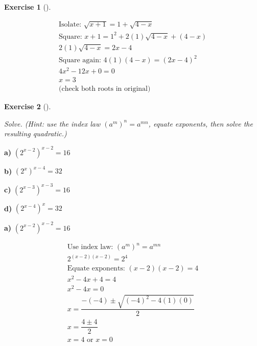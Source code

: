 \documentclass[
  letterpaper,
  DIV=11,
  numbers=noendperiod]{scrreprt}
\theoremstyle{definition}
\newtheorem{exercise}{Exercise}[chapter]
\theoremstyle{remark}
\begin{document}
\begin{exercise}[]
\begin{tcolorbox}
\begin{align*}
\text{Isolate: } \sqrt{x + 1} = 1 + \sqrt{4-x} \\ \text{Square: } x + 1 = 1^2 + 2(1)\sqrt{4-x} + (4-x) \\ 2(1)\sqrt{4-x} = 2x - 4 \\ \text{Square again: } 4(1)(4-x) = (2x -4)^2 \\ 4x^2 -12x +0 = 0 \\ x = 3 \\ \text{(check both roots in original)}
\end{align*}

\end{tcolorbox}

\end{exercise}

\begin{exercise}[]\protect\hypertarget{exr-u6-39}{}\label{exr-u6-39}

\emph{Solve. (Hint: use the index law \((a^m)^n = a^{mn}\), equate
exponents, then solve the resulting quadratic.)}

\textbf{a)} \(\displaystyle \left(2^{x - 2}\right)^{x - 2} = 16\)

\textbf{b)} \(\displaystyle \left(2^{x}\right)^{x - 4} = 32\)

\textbf{c)} \(\displaystyle \left(2^{x - 3}\right)^{x - 3} = 16\)

\textbf{d)} \(\displaystyle \left(2^{x - 4}\right)^{x} = 32\)

\begin{tcolorbox}[enhanced jigsaw, opacitybacktitle=0.6, coltitle=black, arc=.35mm, colframe=quarto-callout-tip-color-frame, colback=white, bottomrule=.15mm, left=2mm, colbacktitle=quarto-callout-tip-color!10!white, titlerule=0mm, opacityback=0, title=\textcolor{quarto-callout-tip-color}{\faLightbulb}\hspace{0.5em}{🔍 View Solutions}, leftrule=.75mm, breakable, rightrule=.15mm, bottomtitle=1mm, toptitle=1mm, toprule=.15mm]

\textbf{a)} \(\displaystyle \left(2^{x - 2}\right)^{x - 2} = 16\)

\begin{align*}
\text{Use index law: } (a^m)^n = a^{mn} \\ 2^{(x - 2)(x - 2)} = 2^{4} \\ \text{Equate exponents: } (x - 2)(x - 2) = 4 \\ x^2 -4x + 4 = 4 \\ x^2 -4x  = 0 \\ x = \dfrac{-(-4) \pm \sqrt{(-4)^2 - 4(1)(0)}}{2} \\ x = \dfrac{4 \pm 4}{2} \\ x = 4 \text{ or } x = 0
\end{align*}


\end{tcolorbox}
\end{exercise}
\end{document}

